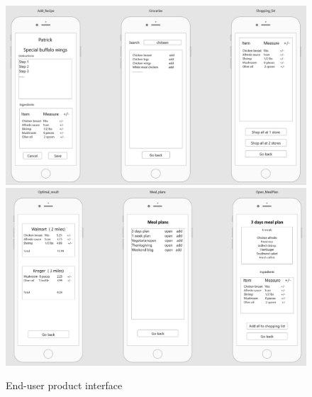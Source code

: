 \begin{figure}[!h]
	\centering
   	\includegraphics[width=1\textwidth]{images/I3.PNG}
   	\includegraphics[width=1\textwidth]{images/I4.PNG}
   	\caption{End-user product interface}
\end{figure}  
    
    
    
    
    
    
   
   	
   	
    

